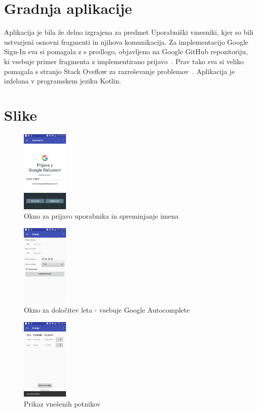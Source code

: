 \documentclass[11pt,a4paper]{article}
\begin{document}
\section{Gradnja aplikacije}

Aplikacija je bila že delno izgrajena za predmet Uporabniški vmesniki, kjer so bili ustvarjeni osnovni fragmenti in njihova komunikacija.
Za implementacijo Google Sign-In sva si pomagala z s predlogo, objavljeno na Google GitHub repozitoriju, ki vsebuje primer fragmenta z implementirano prijavo~\cite{loginSample}.
Prav tako sva si veliko pomagala s stranjo Stack Oveflow za razreševanje problemov~\cite{stack}.
Aplikacija je izdelana v programskem jeziku Kotlin.

\section{Slike}

\begin{figure}[htb]
\centerline{\includegraphics[width=0.2\textwidth]{loginScreen.jpg}}
\caption{Okno za prijavo uporabnika in spreminjanje imena}
\label{sl:koncept}
\end{figure}

\begin{figure}[htb]
	\centerline{\includegraphics[width=0.2\textwidth]{nakupScreen.jpg}}
	\caption{Okno za določitev leta - vsebuje Google Autocomplete}
	\label{sl:koncept}
\end{figure}

\begin{figure}[htb]
	\centerline{\includegraphics[width=0.2\textwidth]{potnikiScreen.jpg}}
	\caption{Prikaz vnešenih potnikov}
	\label{sl:koncept}
\end{figure}









\end{document}
